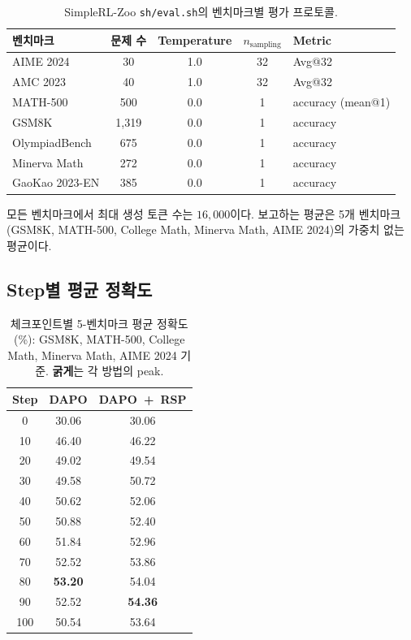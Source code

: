 \begin{table}[H]
\centering
\caption{SimpleRL-Zoo \texttt{sh/eval.sh}의 벤치마크별 평가 프로토콜.}
\label{tab:dapo_eval_protocol}
\footnotesize
\setlength{\tabcolsep}{6pt}
\renewcommand{\arraystretch}{0.9}
\begin{tabular}{lcccl}
\toprule
\textbf{벤치마크} & \textbf{문제 수} & \textbf{Temperature} & \textbf{$n_{\text{sampling}}$} & \textbf{Metric} \\
\midrule
AIME 2024       & 30    & 1.0 & 32 & Avg@32 \\
AMC 2023        & 40    & 1.0 & 32 & Avg@32 \\
MATH-500        & 500   & 0.0 & 1  & accuracy (mean@1) \\
GSM8K           & 1{,}319 & 0.0 & 1  & accuracy \\
OlympiadBench   & 675   & 0.0 & 1  & accuracy \\
Minerva Math    & 272   & 0.0 & 1  & accuracy \\
GaoKao 2023-EN  & 385   & 0.0 & 1  & accuracy \\
\bottomrule
\end{tabular}
\end{table}

모든 벤치마크에서 최대 생성 토큰 수는 $16{,}000$이다. 보고하는 평균은 5개 벤치마크(GSM8K, MATH-500, College Math, Minerva Math, AIME 2024)의 가중치 없는 평균이다.

\subsection{Step별 평균 정확도}

\begin{table}[H]
\centering
\caption{체크포인트별 5-벤치마크 평균 정확도(\%): GSM8K, MATH-500, College Math, Minerva Math, AIME 2024 기준. \textbf{굵게}는 각 방법의 peak.}
\label{tab:dapo_per_step}
\footnotesize
\setlength{\tabcolsep}{6pt}
\renewcommand{\arraystretch}{0.9}
\begin{tabular}{c c c}
\toprule
\textbf{Step} & \textbf{DAPO} & \textbf{DAPO~+~RSP} \\
\midrule
0   & 30.06 & 30.06 \\
10  & 46.40 & 46.22 \\
20  & 49.02 & 49.54 \\
30  & 49.58 & 50.72 \\
40  & 50.62 & 52.06 \\
50  & 50.88 & 52.40 \\
60  & 51.84 & 52.96 \\
70  & 52.52 & 53.86 \\
80  & \textbf{53.20} & 54.04 \\
90  & 52.52 & \textbf{54.36} \\
100 & 50.54 & 53.64 \\
\bottomrule
\end{tabular}
\end{table}

